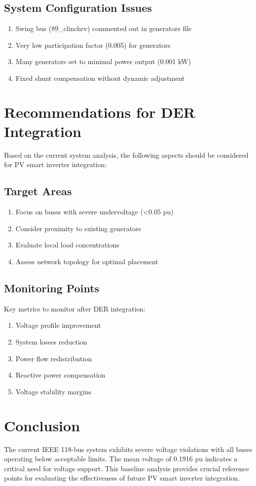 \documentclass[11pt]{article}
\begin{document}
\subsection{System Configuration Issues}
\begin{enumerate}
    \item Swing bus (89\_clinchrv) commented out in generators file
    \item Very low participation factor (0.005) for generators
    \item Many generators set to minimal power output (0.001 kW)
    \item Fixed shunt compensation without dynamic adjustment
\end{enumerate}

\section{Recommendations for DER Integration}
Based on the current system analysis, the following aspects should be considered for PV smart inverter integration:

\subsection{Target Areas}
\begin{enumerate}
    \item Focus on buses with severe undervoltage (<0.05 pu)
    \item Consider proximity to existing generators
    \item Evaluate local load concentrations
    \item Assess network topology for optimal placement
\end{enumerate}

\subsection{Monitoring Points}
Key metrics to monitor after DER integration:
\begin{enumerate}
    \item Voltage profile improvement
    \item System losses reduction
    \item Power flow redistribution
    \item Reactive power compensation
    \item Voltage stability margins
\end{enumerate}

\section{Conclusion}
The current IEEE 118-bus system exhibits severe voltage violations with all buses operating below acceptable limits. The mean voltage of 0.1916 pu indicates a critical need for voltage support. This baseline analysis provides crucial reference points for evaluating the effectiveness of future PV smart inverter integration.
\end{document}
